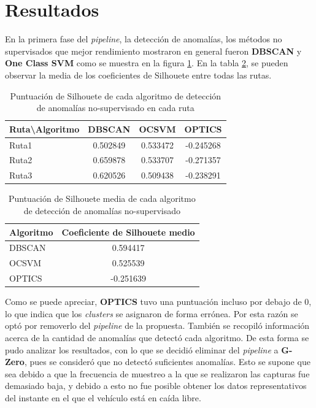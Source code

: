 \section{Resultados}
	En la primera fase del \emph{pipeline}, la detección de anomalías, los métodos no supervisados que mejor rendimiento mostraron en general fueron
	\textbf{DBSCAN} y \textbf{One Class SVM} como se muestra en la figura \ref{table:1}. En la tabla \ref{table:2}, se pueden observar la media
	de los coeficientes de Silhouete entre todas las rutas.

	\begin{table}[htb]
		\centering
		\caption{Puntuación de Silhouete de cada algoritmo de detección de anomalías no-supervisado en cada ruta}
		\label{table:1}
		\begin{tabular}{lccc}
		\toprule
		  Ruta\textbackslash Algoritmo &    DBSCAN &     OCSVM &     OPTICS \\
		\midrule
		  Ruta1 &  0.502849 &  0.533472 &  -0.245268 \\
		  Ruta2 &  0.659878 &  0.533707 &  -0.271357 \\
		  Ruta3 &  0.620526 &  0.509438 &  -0.238291 \\
		\bottomrule
		\end{tabular}
		
	\end{table}

	\begin{table}[htb]
		\centering
		\caption{Puntuación de Silhouete media de cada algoritmo de detección de anomalías no-supervisado}
		\label{table:2}
		\begin{tabular}{lc}
		\toprule
		Algoritmo & Coeficiente de Silhouete medio \\
		\midrule
		   DBSCAN &   0.594417 	\\
		    OCSVM &   0.525539 	\\
		   OPTICS &  -0.251639 	\\
		\bottomrule
		\end{tabular}
		
	\end{table}

	Como se puede apreciar, \textbf{OPTICS} tuvo una puntuación incluso por debajo de 0, lo que indica que los \emph{clusters} se asignaron de 
	forma errónea. Por esta razón se optó por removerlo del \emph{pipeline} de la propuesta. También se recopiló información acerca de la
	cantidad de anomalías que detectó cada algoritmo. De esta forma se pudo analizar los resultados, con lo que se decidió eliminar del \emph
	{pipeline} a \textbf{G-Zero}, pues se consideró que no detectó suficientes anomalías. Esto se supone que sea debido a que la frecuencia de
	muestreo a la que se realizaron las capturas fue demasiado baja, y debido a esto no fue posible obtener los datos representativos del
	instante en el que el vehículo está en caída libre.

